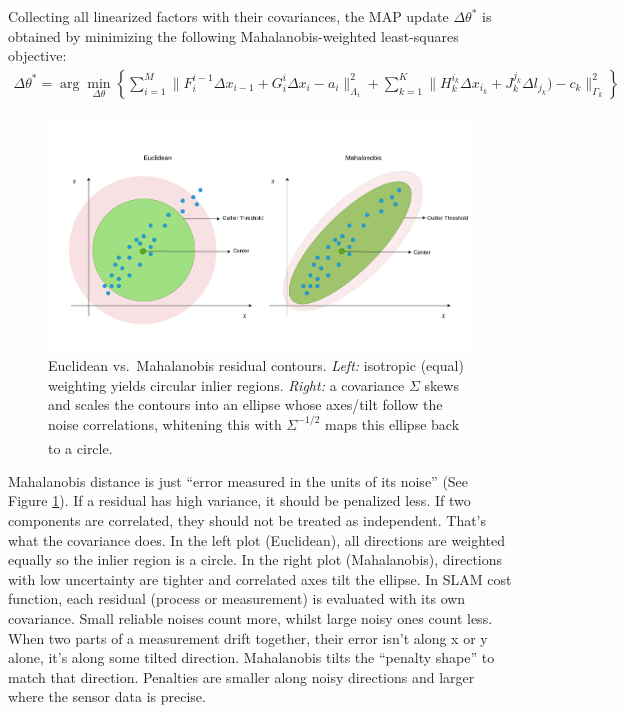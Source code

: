 \\ \\
Collecting all linearized factors with their covariances, the MAP update $\Delta\theta^{*}$ is obtained by minimizing the following Mahalanobis-weighted least-squares objective:
\begin{equation}
    \begin{aligned}
        \Delta\theta^{*} = 
        \arg\min_{\Delta\theta}\left\{ 
            \sum_{i=1}^{M}{\|F_{i}^{i-1}\Delta x_{i-1} + G_{i}^{i}\Delta x_{i} - a_i\|_{\Lambda_i}^{2}} +
            \sum_{k=1}^{K}{\|H_{k}^{i_k}\Delta x_{i_k} + J_{k}^{j_k} \Delta l_{j_k}) - c_k\|_{\Gamma_k}^{2}}
            \right\}
    \end{aligned}
    \label{eq:optimizer-iSAM-delta-theta-star-mahalanobis-form}
\end{equation}
\begin{figure}[H]
    \centering
    \includegraphics[width=0.9\linewidth]{Pictures/Optimizers/iSAM/Mahalanobis_Distance.png}
    \caption{Euclidean vs.\ Mahalanobis residual contours. \textit{Left:} isotropic (equal) weighting yields circular inlier regions. \textit{Right:} a covariance $\Sigma$ skews and scales the contours into an ellipse whose axes/tilt follow the noise correlations, whitening this with $\Sigma^{-1/2}$ maps this ellipse back to a circle.\textsuperscript{\cite{mahalanobis_distance_explained}}}
    \label{fig:mahalanobis-distance}
\end{figure}
\noindent
Mahalanobis distance is just ``error measured in the units of its noise'' (See Figure \ref{fig:mahalanobis-distance}). If a residual has high variance, it should be penalized less. If two components are correlated, they should not be treated as independent. That's what the covariance does. In the left plot (Euclidean), all directions are weighted equally so the inlier region is a circle. In the right plot (Mahalanobis), directions with low uncertainty are tighter and correlated axes tilt the ellipse. In SLAM cost function, each residual (process or measurement) is evaluated with its own covariance. Small reliable noises count more, whilst large noisy ones count less. When two parts of a measurement drift together, their error isn't along x or y alone, it's along some tilted direction. Mahalanobis tilts the ``penalty shape'' to match that direction. Penalties are smaller along noisy directions and larger where the sensor data is precise.
